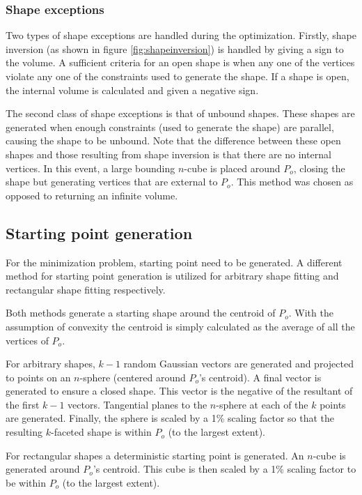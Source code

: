 \subsubsection{Shape exceptions}
Two types of shape exceptions are handled during the optimization.
Firstly, shape inversion (as shown in figure \ref{fig:shapeinversion}) is handled by giving a sign to the volume.
A sufficient criteria for an open shape is when any one of the vertices violate any one of the constraints used to generate the shape.
If a shape is open, the internal volume is calculated and given a negative sign.

The second class of shape exceptions is that of unbound shapes.
These shapes are generated when enough constraints (used to generate the shape) are parallel, causing the shape to be unbound.
Note that the difference between these open shapes and those resulting from shape inversion is that there are no internal vertices.
In this event, a large bounding $n$-cube is placed around $P_o$, closing the shape but generating vertices that are external to $P_o$.
This method was chosen as opposed to returning an infinite volume.

\subsection{Starting point generation}
For the minimization problem, starting point need to be generated.
A different method for starting point generation is utilized for arbitrary shape fitting and rectangular shape fitting respectively.

Both methods generate a starting shape around the centroid of $P_o$.
With the assumption of convexity the centroid is simply calculated as the average of all the vertices of $P_o$.

For arbitrary shapes, $k-1$ random Gaussian vectors are generated and projected to points on an $n$-sphere (centered around $P_o$'s centroid).
A final vector is generated to ensure a closed shape.
This vector is the negative of the resultant of the first $k-1$ vectors.
Tangential planes to the $n$-sphere at each of the $k$ points are generated.
Finally, the sphere is scaled by a 1\% scaling factor so that the resulting $k$-faceted shape is within $P_o$ (to the largest extent).

For rectangular shapes a deterministic starting point is generated.
An $n$-cube is generated around $P_o$'s centroid.
This cube is then scaled by a 1\% scaling factor to be within $P_o$ (to the largest extent).




